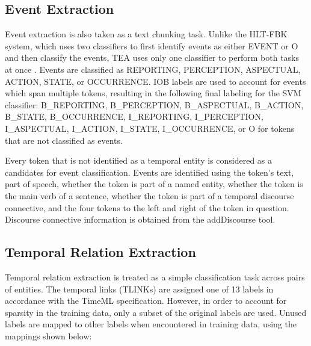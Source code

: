 \documentclass[11pt,letterpaper]{article}
\begin{document}
\subsection{Event Extraction}

Event extraction is also taken as a text chunking task. Unlike the HLT-FBK system, which uses two classifiers to first identify events as either EVENT or O and then classify the events, TEA uses only one classifier to perform both tasks at once \cite{Mirza:15}. Events are classified as REPORTING, PERCEPTION, ASPECTUAL, ACTION, STATE, or OCCURRENCE. IOB labels are used to account for events which span multiple tokens, resulting in the following final labeling for the SVM classifier: B\_REPORTING, B\_PERCEPTION, B\_ASPECTUAL, B\_ACTION, B\_STATE, B\_OCCURRENCE, I\_REPORTING, I\_PERCEPTION, I\_ASPECTUAL, I\_ACTION, I\_STATE, I\_OCCURRENCE, or O for tokens that are not classified as events.

Every token that is not identified as a temporal entity is considered as a candidates for event classification. Events are identified using the token's text, part of speech, whether the token is part of a named entity, whether the token is the main verb of a sentence, whether the token is part of a temporal discourse connective, and the four tokens to the left and right of the token in question. Discourse connective information is obtained from the addDiscourse tool.

\subsection{Temporal Relation Extraction}

Temporal relation extraction is treated as a simple classification task across pairs of entities. The temporal links (TLINKs) are assigned one of 13 labels in accordance with the TimeML specification. However, in order to account for sparsity in the training data, only a subset of the original labels are used. Unused labels are mapped to other labels when encountered in training data, using the mappings shown below:

\vspace{5mm}
\end{document}
